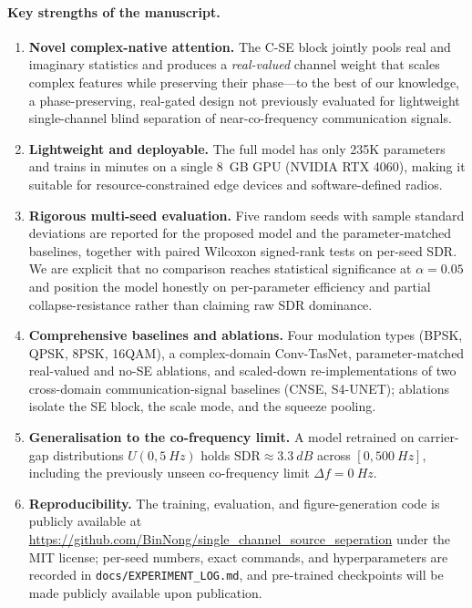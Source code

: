 \documentclass[11pt,a4paper]{article}
\begin{document}
\paragraph{Key strengths of the manuscript.}
\begin{enumerate}
\item \textbf{Novel complex-native attention.} The C-SE block jointly pools real and imaginary statistics and produces a \emph{real-valued} channel weight that scales complex features while preserving their phase---to the best of our knowledge, a phase-preserving, real-gated design not previously evaluated for lightweight single-channel blind separation of near-co-frequency communication signals.
\item \textbf{Lightweight and deployable.} The full model has only 235K parameters and trains in minutes on a single \SI{8}{GB} GPU (NVIDIA RTX 4060), making it suitable for resource-constrained edge devices and software-defined radios.
\item \textbf{Rigorous multi-seed evaluation.} Five random seeds with sample standard deviations are reported for the proposed model and the parameter-matched baselines, together with paired Wilcoxon signed-rank tests on per-seed SDR. We are explicit that no comparison reaches statistical significance at $\alpha=0.05$ and position the model honestly on per-parameter efficiency and partial collapse-resistance rather than claiming raw SDR dominance.
\item \textbf{Comprehensive baselines and ablations.} Four modulation types (BPSK, QPSK, 8PSK, 16QAM), a complex-domain Conv-TasNet, parameter-matched real-valued and no-SE ablations, and scaled-down re-implementations of two cross-domain communication-signal baselines (CNSE, S4-UNET); ablations isolate the SE block, the scale mode, and the squeeze pooling.
\item \textbf{Generalisation to the co-frequency limit.} A model retrained on carrier-gap distributions $U(0, \SI{5}{Hz})$ holds $\text{SDR}\approx\SI{3.3}{dB}$ across $[0, \SI{500}{Hz}]$, including the previously unseen co-frequency limit $\Delta f=\SI{0}{Hz}$.
\item \textbf{Reproducibility.} The training, evaluation, and figure-generation code is publicly available at \url{https://github.com/BinNong/single_channel_source_seperation} under the MIT license; per-seed numbers, exact commands, and hyperparameters are recorded in \texttt{docs/EXPERIMENT\_LOG.md}, and pre-trained checkpoints will be made publicly available upon publication.
\end{enumerate}
\end{document}
